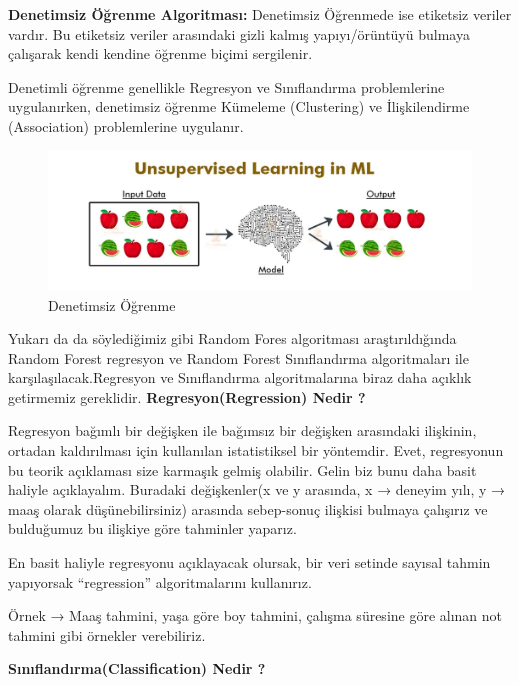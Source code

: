 \documentclass[12pt, a4paper]{article}
\begin{document}
	\textbf{Denetimsiz Öğrenme Algoritması:} Denetimsiz Öğrenmede ise etiketsiz veriler vardır. Bu etiketsiz veriler arasındaki gizli kalmış yapıyı/örüntüyü bulmaya çalışarak kendi kendine öğrenme biçimi sergilenir.\newline
	
	Denetimli öğrenme genellikle Regresyon ve Sınıflandırma problemlerine uygulanırken, denetimsiz öğrenme Kümeleme (Clustering) ve İlişkilendirme (Association) problemlerine uygulanır.
	\begin{figure}[!htbp] 
		\caption{ Denetimsiz Öğrenme  }
		\centering
		\includegraphics[angle=0, width=\textwidth]{resim2.png}
		
	\end{figure} 
	\newline
	Yukarı da da söylediğimiz gibi Random Fores algoritması araştırıldığında Random Forest regresyon ve Random Forest Sınıflandırma algoritmaları ile karşılaşılacak.Regresyon ve Sınıflandırma algoritmalarına biraz daha açıklık getirmemiz gereklidir.\newline
	\textbf{Regresyon(Regression) Nedir ?}
	
	
	Regresyon bağımlı bir değişken ile bağımsız bir değişken arasındaki ilişkinin, ortadan kaldırılması için kullanılan istatistiksel bir yöntemdir. Evet, regresyonun bu teorik açıklaması size karmaşık gelmiş olabilir. Gelin biz bunu daha basit haliyle açıklayalım. Buradaki değişkenler(x ve y arasında, x → deneyim yılı, y → maaş olarak düşünebilirsiniz) arasında sebep-sonuç ilişkisi bulmaya çalışırız ve bulduğumuz bu ilişkiye göre tahminler yaparız.
	
	En basit haliyle regresyonu açıklayacak olursak, bir veri setinde sayısal tahmin yapıyorsak “regression” algoritmalarını kullanırız.
	
	Örnek → Maaş tahmini, yaşa göre boy tahmini, çalışma süresine göre alınan not tahmini gibi örnekler verebiliriz. \newline
	
	\textbf{Sınıflandırma(Classification) Nedir ?}
	
\end{document}
